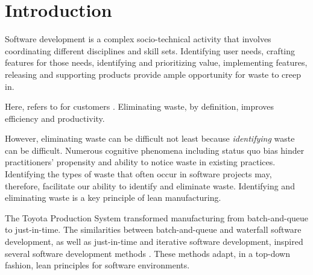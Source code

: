 
\section{Introduction}


Software development is a complex socio-technical activity that involves coordinating different disciplines and skill sets. Identifying user needs, crafting features for those needs, identifying and prioritizing value, implementing features, releasing and supporting products provide ample opportunity for waste to creep in. 


Here,  refers to  for customers \cite{WomackLeanThinking}. Eliminating waste, by definition, improves efficiency and productivity. 


However, eliminating waste can be difficult not least because \textit{identifying} waste can be difficult.  Numerous cognitive phenomena including status quo bias \cite{JostDecadeOfSystemJustification} hinder practitioners' propensity and ability to notice waste in existing practices. Identifying the types of waste that often occur in software projects  may, therefore, facilitate our ability to identify and eliminate waste. Identifying and eliminating waste is a key principle of lean manufacturing. 


The Toyota Production System \cite{OhnoToyotaProductionSystem, ShingoToyotaProductionSystem} transformed manufacturing from batch-and-queue to just-in-time. The similarities between batch-and-queue and waterfall software development, as well as just-in-time and iterative software development, inspired several software development methods \cite{PoppendieckLeanSoftwareDevelopment, AndersonKanban}. These methods adapt, in a top-down fashion, lean principles for software environments. 



